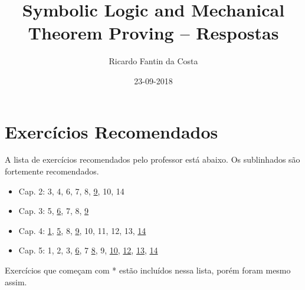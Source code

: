 \documentclass[a4paper,10pt]{article}
\title{Symbolic Logic and Mechanical Theorem Proving -- Respostas}
\author{Ricardo Fantin da Costa}
\date{23-09-2018}
\begin{document}
\maketitle

\section{Exercícios Recomendados}
A lista de exercícios recomendados pelo professor está abaixo. Os sublinhados são fortemente recomendados.

\begin{itemize}
 \item Cap. 2: 3, 4, 6, 7, 8, \underline{9}, 10, 14
 \item Cap. 3: 5, \underline{6}, 7, 8, \underline{9}
 \item Cap. 4: \underline{1}, \underline{5}, 8, \underline{9}, 10, 11, 12, 13, \underline{14}
 \item Cap. 5: 1, 2, 3, \underline{6}, 7 \underline{8}, 9, \underline{10}, \underline{12}, \underline{13}, \underline{14}
\end{itemize}

Exercícios que começam com * estão incluídos nessa lista, porém foram mesmo assim.





\end{document}
